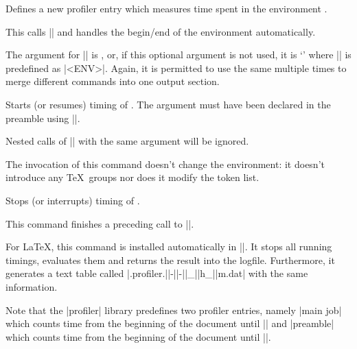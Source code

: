 \begin{command}{\pgfprofilenewforenvironment{}}
    Defines a new profiler entry which measures time spent in the environment
    .

    This calls |\pgfprofilenew| and handles the begin/end of the environment
    automatically.

    The argument for |\pgfprofilenew| is , or, if
    this optional argument is not used, it is
    `\declareandlabel{\pgfprofileenv}' where
    |\pgfprofileenv| is predefined as |<ENV>|. Again, it is permitted to use
    the same  multiple times to merge different
    commands into one output section.
\end{command}

\begin{command}{\pgfprofilestart{}}
    Starts (or resumes) timing of . The argument must
    have been declared in the preamble using |\pgfprofilenew|.

    Nested calls of |\pgfprofilestart| with the same argument will be ignored.

    The invocation of this command doesn't change the environment: it doesn't
    introduce any \TeX\ groups nor does it modify the token list.
\end{command}

\begin{command}{\pgfprofileend{}}
    Stops (or interrupts) timing of .

    This command finishes a preceding call to |\pgfprofilestart|.
\end{command}

\begin{command}{\pgfprofilepostprocess}
    For \LaTeX, this command is installed automatically in ||. It
    stops all running timings, evaluates them and returns the result into the
    logfile. Furthermore, it generates a text table called
    |\jobname.profiler.||-||-||_||h_||m.dat|
    with the same information.

    Note that the |profiler| library predefines two profiler entries, namely
    |main job| which counts time from the beginning of the document until
    |\pgfprofilepostprocess| and |preamble| which counts time from the
    beginning of the document until ||.
\end{command}

